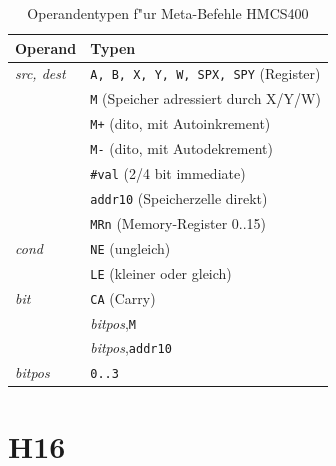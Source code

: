 \documentclass[12pt,a4paper,twoside]{report}
\newcommand{\tty}[1]{{\tt #1}}
\begin{document}
\begin{table}
\begin{center}\begin{tabular}{|l|l|}
\hline
Operand                 & Typen \\
\hline
{\em src, dest}         & \tty{A, B, X, Y, W, SPX, SPY} (Register) \\
                        & \tty{M} (Speicher adressiert durch X/Y/W) \\
                        & \tty{M+} (dito, mit Autoinkrement) \\
                        & \tty{M-} (dito, mit Autodekrement) \\
                        & \tty{\#val} (2/4 bit immediate) \\
                        & \tty{addr10} (Speicherzelle direkt) \\
                        & \tty{MRn} (Memory-Register 0..15) \\
{\em cond}              & \tty{NE} (ungleich) \\
                        & \tty{LE} (kleiner oder gleich) \\
{\em bit}               & \tty{CA} (Carry) \\
                        & {\em bitpos},\tty{M} \\
                        & {\em bitpos},\tty{addr10} \\
{\em bitpos}            & \tty{0..3} \\
\hline
\end{tabular}\end{center}
\caption{Operandentypen f"ur Meta-Befehle HMCS400}
\label{TabHMCS400MetaOps}
\end{table}


\section{H16}
\end{document}
